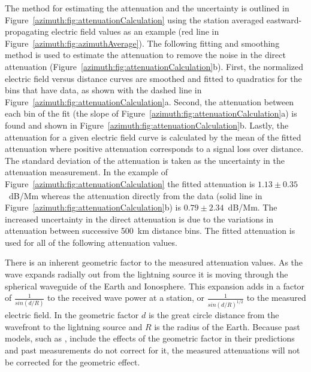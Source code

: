The method for estimating the attenuation and the uncertainty is outlined in Figure~\ref{azimuth:fig:attenuationCalculation} using the station averaged eastward-propagating electric field values as an example (red line in Figure~\ref{azimuth:fig:azimuthAverage}).
The following fitting and smoothing method is used to estimate the attenuation to remove the noise in the direct attenuation (Figure~\ref{azimuth:fig:attenuationCalculation}b). 
First, the normalized electric field versus distance curves are smoothed and fitted to quadratics for the bins that have data, as shown with the dashed line in Figure~\ref{azimuth:fig:attenuationCalculation}a.
Second, the attenuation between each bin of the fit (the slope of Figure~\ref{azimuth:fig:attenuationCalculation}a) is found and shown in Figure~\ref{azimuth:fig:attenuationCalculation}b.
Lastly, the attenuation for a given electric field curve is calculated by the mean of the fitted attenuation where positive attenuation corresponds to a signal loss over distance.
The standard deviation of the attenuation is taken as the uncertainty in the attenuation measurement.
In the example of Figure~\ref{azimuth:fig:attenuationCalculation} the fitted attenuation is $1.13\pm0.35$~dB/Mm whereas the attenuation directly from the data (solid line in Figure~\ref{azimuth:fig:attenuationCalculation}b) is $0.79\pm2.34$~dB/Mm.
The increased uncertainty in the direct attenuation is due to the variations in attenuation between successive 500~km distance bins.
The fitted attenuation is used for all of the following attenuation values.

There is an inherent geometric factor to the measured attenuation values.
As the wave expands radially out from the lightning source it is moving through the spherical waveguide of the Earth and Ionosphere.
This expansion adds in a factor of $\frac{1}{sin(d/R)}$ to the received wave power at a station, or $\frac{1}{sin(d/R)^{1/2}}$ to the measured electric field.
In the geometric factor $d$ is the great circle distance from the wavefront to the lightning source and $R$ is the radius of the Earth.
Because past models, such as \citet{Wait1960}, include the effects of the geometric factor in their predictions and past measurements do not correct for it, the measured attenuations will not be corrected for the geometric effect.

